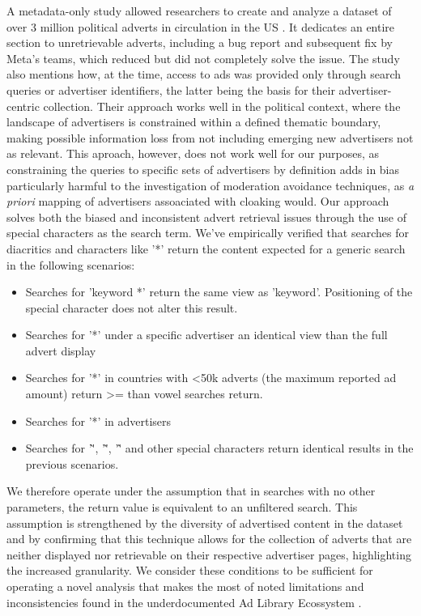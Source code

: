 A metadata-only study allowed researchers to create and analyze a dataset of over 3 million political adverts in circulation in the US \cite{adlibSecAudit}. It dedicates an entire section to unretrievable adverts, including a bug report and subsequent fix by Meta's teams, which reduced but did not completely solve the issue. The study also mentions how, at the time, access to ads was provided only through search queries or advertiser identifiers, the latter being the basis for their advertiser-centric collection. Their approach works well in the political context, where the landscape of advertisers is constrained within a defined thematic boundary, making possible information loss from not including emerging new advertisers not as relevant. This aproach, however, does not work well for our purposes, as constraining the queries to specific sets of advertisers by definition adds in bias particularly harmful to the investigation of moderation avoidance techniques, as \textit{a priori} mapping of advertisers assoaciated with cloaking would. Our approach solves both the biased and inconsistent advert retrieval issues through the use of special characters as the search term. We've empirically verified that searches for diacritics and characters like '*' return the content expected for a generic search in the following scenarios:
\begin{itemize}
    \item Searches for 'keyword *' return the same view as 'keyword'. Positioning of the special character does not alter this result.
    \item Searches for '*' under a specific advertiser an identical view than the full advert display
    \item Searches for '*' in countries with <50k adverts (the maximum reported ad amount) return >= than vowel searches return.
    \item Searches for '*' in advertisers 
    \item Searches for '\`', '\~', '\^' and other special characters return identical results in the previous scenarios.
\end{itemize}
We therefore operate under the assumption that in searches with no other parameters, the return value is equivalent to an unfiltered search. This assumption is strengthened by the diversity of advertised content in the dataset and by confirming that this technique allows for the collection of adverts that are neither displayed nor retrievable on their respective advertiser pages, highlighting the increased granularity. We consider these conditions to be sufficient for operating a novel analysis that makes the most of noted limitations and inconsistencies found in the underdocumented Ad Library Ecossystem \cite{transparencyLimitationAdLib, metaAudit, adLibBet, adlibSecAudit}.

